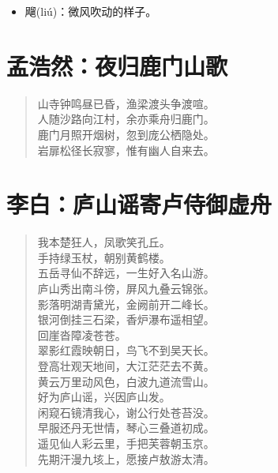 \documentclass[12pt,oneside]{book}
\newenvironment{shici}{%
\begin{verse}\centering\yanti\large\hspace{12pt}}{\end{verse}}
\begin{document}
\begin{common-format}
\begin{itemize}
\item 飗(liú)：微风吹动的样子。
\end{itemize}

\chapter{孟浩然：夜归鹿门山歌}
\begin{shici}
山寺钟鸣昼已昏，渔梁渡头争渡喧。\\
人随沙路向江村，余亦乘舟归鹿门。\\
鹿门月照开烟树，忽到庞公栖隐处。\\
岩扉松径长寂寥，惟有幽人自来去。
\end{shici}

\chapter{李白：庐山谣寄卢侍御虚舟}
\begin{shici}
我本楚狂人，凤歌笑孔丘。\\
手持绿玉杖，朝别黄鹤楼。\\
五岳寻仙不辞远，一生好入名山游。\\
庐山秀出南斗傍，屏风九叠云锦张。\\
影落明湖青黛光，金阙前开二峰长。\\
银河倒挂三石梁，香炉瀑布遥相望。\\
回崖沓障凌苍苍。\\
翠影红霞映朝日，鸟飞不到吴天长。\\
登高壮观天地间，大江茫茫去不黄。\\
黄云万里动风色，白波九道流雪山。\\
好为庐山谣，兴因庐山发。\\
闲窥石镜清我心，谢公行处苍苔没。\\
早服还丹无世情，琴心三叠道初成。\\
遥见仙人彩云里，手把芙蓉朝玉京。\\
先期汗漫九垓上，愿接卢敖游太清。
\end{shici}


\end{common-format}
\end{document}
